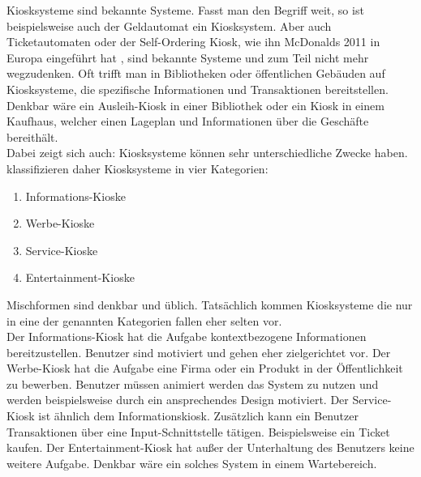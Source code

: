 Kiosksysteme sind bekannte Systeme. Fasst man den Begriff weit, so ist beispielsweise auch der Geldautomat ein Kiosksystem.
Aber auch Ticketautomaten oder der Self-Ordering Kiosk, wie ihn McDonalds 2011 in Europa 
eingeführt hat \cite{mcdonalds}, sind bekannte Systeme und zum Teil nicht mehr wegzudenken. Oft trifft man in 
Bibliotheken oder öffentlichen Gebäuden auf Kiosksysteme, die spezifische Informationen und Transaktionen 
bereitstellen. Denkbar wäre ein Ausleih-Kiosk in einer Bibliothek oder ein Kiosk in einem Kaufhaus, welcher einen
Lageplan und Informationen über die Geschäfte bereithält.\\

Dabei zeigt sich auch: Kiosksysteme können sehr unterschiedliche Zwecke haben.  klassifizieren daher
Kiosksysteme in vier Kategorien:

\begin{enumerate}
\item Informations-Kioske
\item Werbe-Kioske
\item Service-Kioske
\item Entertainment-Kioske
\end{enumerate}

Mischformen sind denkbar und üblich. Tatsächlich kommen Kiosksysteme die nur in eine der genannten Kategorien fallen
eher selten vor.\\
Der Informations-Kiosk hat die Aufgabe kontextbezogene Informationen bereitzustellen. Benutzer sind motiviert und
gehen eher zielgerichtet vor. 
Der Werbe-Kiosk hat die Aufgabe eine Firma oder ein Produkt in der Öffentlichkeit zu
bewerben. Benutzer müssen animiert werden das System zu nutzen und werden beispielsweise durch ein ansprechendes
Design motiviert.
Der Service-Kiosk ist ähnlich dem Informationskiosk. Zusätzlich kann ein Benutzer Transaktionen über eine 
Input-Schnittstelle tätigen. Beispielsweise ein Ticket kaufen.
Der Entertainment-Kiosk hat außer der Unterhaltung des Benutzers keine weitere Aufgabe. Denkbar wäre ein solches
System in einem Wartebereich. 